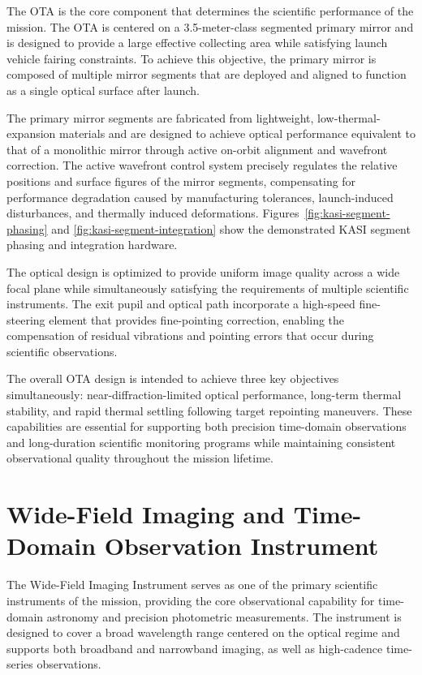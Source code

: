 The OTA is the core component that determines the scientific performance of the mission. The OTA is centered on a 3.5-meter-class segmented primary mirror and is designed to provide a large effective collecting area while satisfying launch vehicle fairing constraints. To achieve this objective, the primary mirror is composed of multiple mirror segments that are deployed and aligned to function as a single optical surface after launch.

The primary mirror segments are fabricated from lightweight, low-thermal-expansion materials and are designed to achieve optical performance equivalent to that of a monolithic mirror through active on-orbit alignment and wavefront correction. The active wavefront control system precisely regulates the relative positions and surface figures of the mirror segments, compensating for performance degradation caused by manufacturing tolerances, launch-induced disturbances, and thermally induced deformations. Figures~\ref{fig:kasi-segment-phasing} and
\ref{fig:kasi-segment-integration} show the demonstrated KASI segment phasing and integration hardware.

The optical design is optimized to provide uniform image quality across a wide focal plane while simultaneously satisfying the requirements of multiple scientific instruments. The exit pupil and optical path incorporate a high-speed fine-steering element that provides fine-pointing correction, enabling the compensation of residual vibrations and pointing errors that occur during scientific observations.

The overall OTA design is intended to achieve three key objectives simultaneously: near-diffraction-limited optical performance, long-term thermal stability, and rapid thermal settling following target repointing maneuvers. These capabilities are essential for supporting both precision time-domain observations and long-duration scientific monitoring programs while maintaining consistent observational quality throughout the mission lifetime.

\section{Wide-Field Imaging and Time-Domain Observation Instrument}\label{wide-field-imaging-and-time-domain-observation-instrument}

The Wide-Field Imaging Instrument serves as one of the primary scientific instruments of the mission, providing the core observational capability for time-domain astronomy and precision photometric measurements. The instrument is designed to cover a broad wavelength range centered on the optical regime and supports both broadband and narrowband imaging, as well as high-cadence time-series observations.

